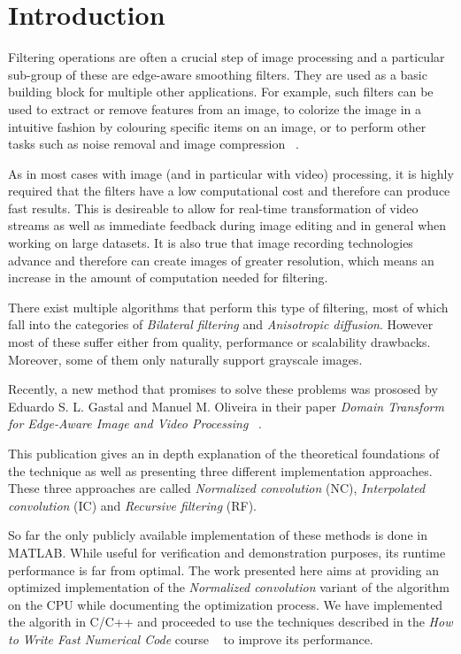 \section{Introduction}\label{sec:intro}

Filtering operations are often a crucial step of image processing and a particular sub-group of these are edge-aware smoothing filters. 
They are used as a basic building block for multiple other applications.
For example, such filters can be used to extract or remove features from an
image, to colorize the image in a intuitive fashion by colouring specific
items on an image, or to perform other tasks such as noise removal and
image compression ~\cite{GastalOliveira2011DomainTransform}.

As in most cases with image (and in particular with video) processing, it is highly required that the filters have a low computational cost and therefore can produce fast results. This is desireable to allow for real-time transformation of video streams as well as immediate feedback during image editing and in general when working on large datasets. 
It is also true that image recording technologies advance and therefore can create images of greater resolution, which means an increase in
the amount of computation needed for filtering.

There exist multiple algorithms that perform this type of filtering, most of which fall into the categories of \textit{Bilateral filtering} and \textit{Anisotropic diffusion}. However most of these suffer either from quality, performance or scalability drawbacks. Moreover, some of them only naturally support grayscale images.

Recently, a new method that promises to solve these problems was prososed by Eduardo S. L. Gastal and Manuel M. Oliveira in their paper \textit{Domain Transform for Edge-Aware Image and Video Processing} ~\cite{GastalOliveira2011DomainTransform}.

This publication gives an in depth explanation of the theoretical foundations of the technique as well as presenting three different implementation approaches. These three approaches are called \textit{Normalized convolution} (NC), \textit{Interpolated convolution} (IC) and \textit{Recursive filtering} (RF).

So far the only publicly available implementation of these methods is done in MATLAB. While useful for verification and demonstration purposes, its runtime performance is far from optimal. The work presented here aims at providing an optimized implementation of the \textit{Normalized convolution} variant of the algorithm on the CPU while documenting the optimization process. We have implemented the algorith in C/C++ and proceeded to use the techniques described in the \textit{How to Write Fast Numerical Code} course ~\cite{HowToFastNumCode:2013:Webpage} to improve its performance.

